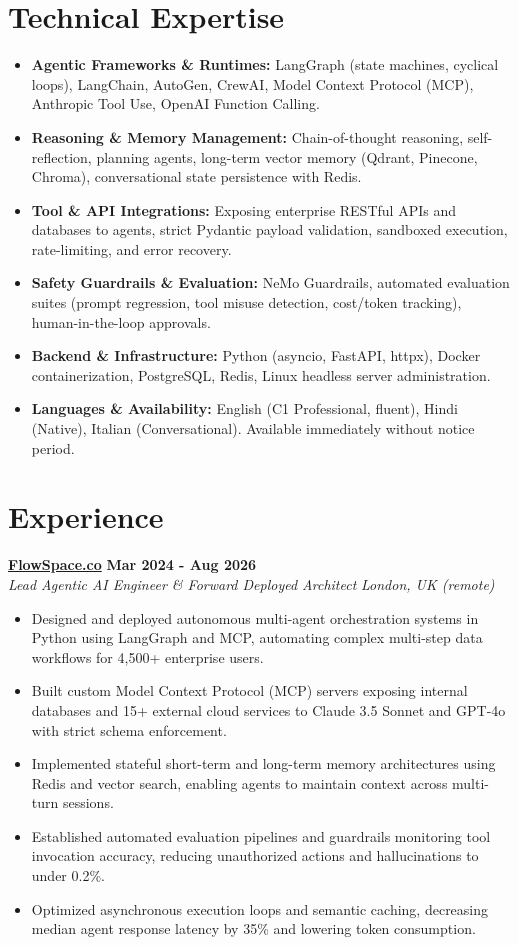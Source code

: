 \documentclass[10pt,a4paper]{article}
\newcommand{\role}[4]{%
  \textbf{#1} \hfill \textbf{#2}\\[1pt]%
  \textit{#3} \hfill \textit{#4}\\[2pt]%
}
\begin{document}
\section{Technical Expertise}
\begin{itemize}
  \item \textbf{Agentic Frameworks \& Runtimes:} LangGraph (state machines, cyclical loops), LangChain, AutoGen, CrewAI, Model Context Protocol (MCP), Anthropic Tool Use, OpenAI Function Calling.
  \item \textbf{Reasoning \& Memory Management:} Chain-of-thought reasoning, self-reflection, planning agents, long-term vector memory (Qdrant, Pinecone, Chroma), conversational state persistence with Redis.
  \item \textbf{Tool \& API Integrations:} Exposing enterprise RESTful APIs and databases to agents, strict Pydantic payload validation, sandboxed execution, rate-limiting, and error recovery.
  \item \textbf{Safety Guardrails \& Evaluation:} NeMo Guardrails, automated evaluation suites (prompt regression, tool misuse detection, cost/token tracking), human-in-the-loop approvals.
  \item \textbf{Backend \& Infrastructure:} Python (asyncio, FastAPI, httpx), Docker containerization, PostgreSQL, Redis, Linux headless server administration.
  \item \textbf{Languages \& Availability:} English (C1 Professional, fluent), Hindi (Native), Italian (Conversational). Available immediately without notice period.
\end{itemize}

\section{Experience}

\role{\href{https://flowspace.co}{FlowSpace.co}}{Mar 2024 - Aug 2026}{Lead Agentic AI Engineer \& Forward Deployed Architect}{London, UK (remote)}
\begin{itemize}
  \item Designed and deployed autonomous multi-agent orchestration systems in Python using LangGraph and MCP, automating complex multi-step data workflows for 4,500+ enterprise users.
  \item Built custom Model Context Protocol (MCP) servers exposing internal databases and 15+ external cloud services to Claude 3.5 Sonnet and GPT-4o with strict schema enforcement.
  \item Implemented stateful short-term and long-term memory architectures using Redis and vector search, enabling agents to maintain context across multi-turn sessions.
  \item Established automated evaluation pipelines and guardrails monitoring tool invocation accuracy, reducing unauthorized actions and hallucinations to under 0.2\%.
  \item Optimized asynchronous execution loops and semantic caching, decreasing median agent response latency by 35\% and lowering token consumption.
\end{itemize}
\end{document}
